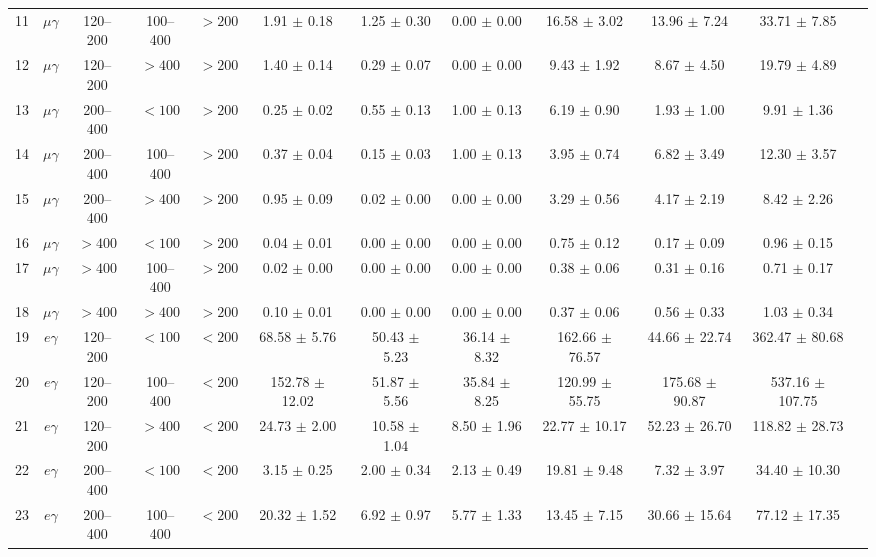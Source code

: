 \begin{table}[htbp]
{\begin{tabular}{|c|c|c|c|c|c|c|c|c|c|c|c|}
11 & $\mu\gamma$ & 120--200 & 100--400 & $>200$ & 1.91 $\pm$ 0.18 & 1.25 $\pm$ 0.30 & 0.00 $\pm$ 0.00 & 16.58 $\pm$ 3.02 & 13.96 $\pm$ 7.24 & 33.71 $\pm$ 7.85 &  \\
12 & $\mu\gamma$ & 120--200 & $>400$ & $>200$ & 1.40 $\pm$ 0.14 & 0.29 $\pm$ 0.07 & 0.00 $\pm$ 0.00 & 9.43 $\pm$ 1.92 & 8.67 $\pm$ 4.50 & 19.79 $\pm$ 4.89 &  \\
13 & $\mu\gamma$ & 200--400 & $<100$ & $>200$ & 0.25 $\pm$ 0.02 & 0.55 $\pm$ 0.13 & 1.00 $\pm$ 0.13 & 6.19 $\pm$ 0.90 & 1.93 $\pm$ 1.00 & 9.91 $\pm$ 1.36 &  \\
14 & $\mu\gamma$ & 200--400 & 100--400 & $>200$ & 0.37 $\pm$ 0.04 & 0.15 $\pm$ 0.03 & 1.00 $\pm$ 0.13 & 3.95 $\pm$ 0.74 & 6.82 $\pm$ 3.49 & 12.30 $\pm$ 3.57 &  \\
15 & $\mu\gamma$ & 200--400 & $>400$ & $>200$ & 0.95 $\pm$ 0.09 & 0.02 $\pm$ 0.00 & 0.00 $\pm$ 0.00 & 3.29 $\pm$ 0.56 & 4.17 $\pm$ 2.19 & 8.42 $\pm$ 2.26 &  \\
16 & $\mu\gamma$ & $>400$ & $<100$ & $>200$ & 0.04 $\pm$ 0.01 & 0.00 $\pm$ 0.00 & 0.00 $\pm$ 0.00 & 0.75 $\pm$ 0.12 & 0.17 $\pm$ 0.09 & 0.96 $\pm$ 0.15 &  \\
17 & $\mu\gamma$ & $>400$ & 100--400 & $>200$ & 0.02 $\pm$ 0.00 & 0.00 $\pm$ 0.00 & 0.00 $\pm$ 0.00 & 0.38 $\pm$ 0.06 & 0.31 $\pm$ 0.16 & 0.71 $\pm$ 0.17 &  \\
18 & $\mu\gamma$ & $>400$ & $>400$ & $>200$ & 0.10 $\pm$ 0.01 & 0.00 $\pm$ 0.00 & 0.00 $\pm$ 0.00 & 0.37 $\pm$ 0.06 & 0.56 $\pm$ 0.33 & 1.03 $\pm$ 0.34 &  \\
\hline
19 & $e\gamma$ & 120--200 & $<100$ & $<200$ & 68.58 $\pm$ 5.76 & 50.43 $\pm$ 5.23 & 36.14 $\pm$ 8.32 & 162.66 $\pm$ 76.57 & 44.66 $\pm$ 22.74 & 362.47 $\pm$ 80.68 &  \\
20 & $e\gamma$ & 120--200 & 100--400 & $<200$ & 152.78 $\pm$ 12.02 & 51.87 $\pm$ 5.56 & 35.84 $\pm$ 8.25 & 120.99 $\pm$ 55.75 & 175.68 $\pm$ 90.87 & 537.16 $\pm$ 107.75 &  \\
21 & $e\gamma$ & 120--200 & $>400$ & $<200$ & 24.73 $\pm$ 2.00 & 10.58 $\pm$ 1.04 & 8.50 $\pm$ 1.96 & 22.77 $\pm$ 10.17 & 52.23 $\pm$ 26.70 & 118.82 $\pm$ 28.73 &  \\
22 & $e\gamma$ & 200--400 & $<100$ & $<200$ & 3.15 $\pm$ 0.25 & 2.00 $\pm$ 0.34 & 2.13 $\pm$ 0.49 & 19.81 $\pm$ 9.48 & 7.32 $\pm$ 3.97 & 34.40 $\pm$ 10.30 &  \\
23 & $e\gamma$ & 200--400 & 100--400 & $<200$ & 20.32 $\pm$ 1.52 & 6.92 $\pm$ 0.97 & 5.77 $\pm$ 1.33 & 13.45 $\pm$ 7.15 & 30.66 $\pm$ 15.64 & 77.12 $\pm$ 17.35 &  \\

\end{tabular}}
\end{table}
